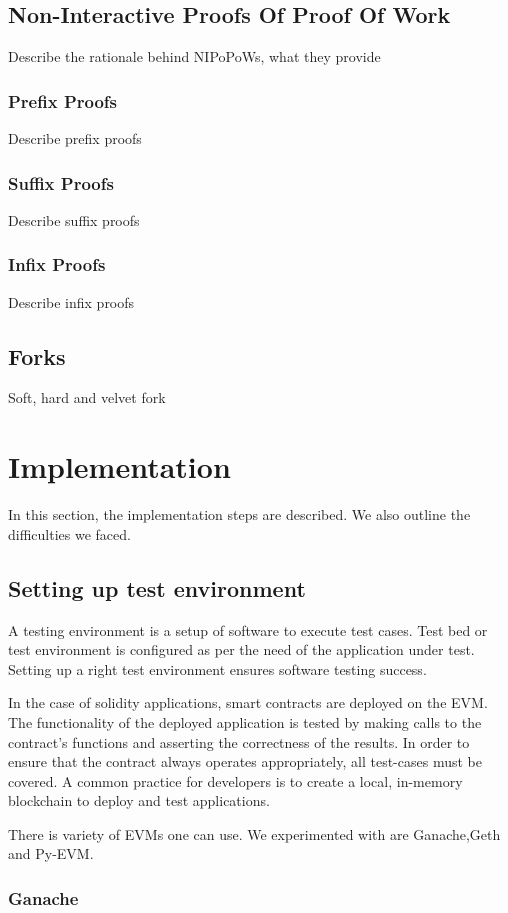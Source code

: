 \documentclass{article}
\begin{document}
\subsection{Non-Interactive Proofs Of Proof Of Work}
Describe the rationale behind NIPoPoWs, what they provide
\subsubsection{Prefix Proofs}
Describe prefix proofs
\subsubsection{Suffix Proofs}
Describe suffix proofs
\subsubsection{Infix Proofs}
Describe infix proofs
\subsection{Forks}
Soft, hard and velvet fork

\section{Implementation}
In this section, the implementation steps are described. We also outline the difficulties we faced.

\subsection{Setting up test environment}
A testing environment is a setup of software to execute test cases. Test bed or test environment is configured as per the need of the application under test. Setting up a right test environment ensures software testing success.

In the case of solidity applications, smart contracts are deployed on the EVM. The functionality of the deployed application is tested by making calls to the contract's functions and asserting the correctness of the results. In order to ensure that the contract always operates appropriately, all test-cases must be covered. A common practice for developers is to create a local, in-memory blockchain to deploy and test applications.

There is variety of EVMs one can use. We experimented with are Ganache,Geth and Py-EVM.

\subsubsection{Ganache}
\end{document}
